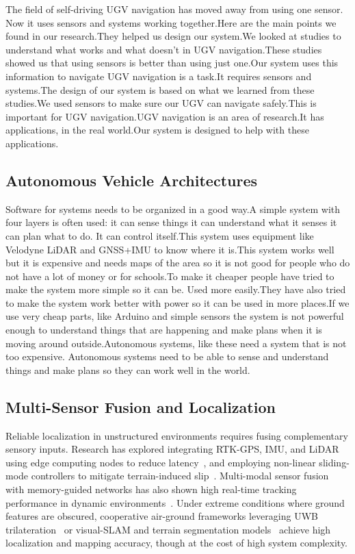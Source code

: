 \documentclass[runningheads]{llncs}
\begin{document}
The field of self-driving UGV navigation has moved away from using one sensor. Now it uses sensors and systems working together.Here are the main points we found in our research.They helped us design our system.We looked at studies to understand what works and what doesn't in UGV navigation.These studies showed us that using sensors is better than using just one.Our system uses this information to navigate UGV navigation is a task.It requires sensors and systems.The design of our system is based on what we learned from these studies.We used sensors to make sure our UGV can navigate safely.This is important for UGV navigation.UGV navigation is an area of research.It has applications, in the real world.Our system is designed to help with these applications.

\subsection{Autonomous Vehicle Architectures}

Software for systems needs to be organized in a good way.A simple system with four layers is often used: it can sense things it can understand what it senses it can plan what to do. It can control itself.This system uses equipment like Velodyne LiDAR and GNSS+IMU to know where it is.This system works well but it is expensive and needs maps of the area so it is not good for people who do not have a lot of money or for schools.To make it cheaper people have tried to make the system more simple so it can be. Used more easily.They have also tried to make the system work better with power so it can be used in more places.If we use very cheap parts, like Arduino and simple sensors the system is not powerful enough to understand things that are happening and make plans when it is moving around outside.Autonomous systems, like these need a system that is not too expensive.
Autonomous systems need to be able to sense and understand things and make plans so they can work well in the world.

\subsection{Multi-Sensor Fusion and Localization}

Reliable localization in unstructured environments requires fusing complementary sensory inputs. Research has explored integrating RTK-GPS, IMU, and LiDAR using edge computing nodes to reduce latency~\cite{seelam2025iot}, and employing non-linear sliding-mode controllers to mitigate terrain-induced slip~\cite{gonzalez2025robust}. Multi-modal sensor fusion with memory-guided networks has also shown high real-time tracking performance in dynamic environments~\cite{han2025real}. Under extreme conditions where ground features are obscured, cooperative air-ground frameworks leveraging UWB trilateration~\cite{yue2025uav} or visual-SLAM and terrain segmentation models~\cite{gupta2025drone} achieve high localization and mapping accuracy, though at the cost of high system complexity.
\end{document}
